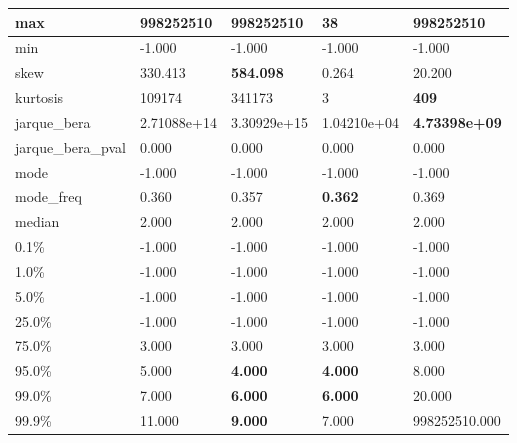 \begin{table}[H]
\begin{tabular}{|l|m{10em}|m{10em}|m{10em}|m{10em}|}
\hline max & 998252510 & \bfseries 998252510 & \cellcolor[rgb]{0.9, 0.54, 0.52} 38 & \bfseries 998252510 \\
\hline min & -1.000 & -1.000 & -1.000 & -1.000 \\
\hline skew & 330.413 & \bfseries 584.098 & \cellcolor[rgb]{0.9, 0.54, 0.52} 0.264 & 20.200 \\
\hline kurtosis & 109174 & \cellcolor[rgb]{0.9, 0.54, 0.52} 341173 & 3 & \bfseries 409 \\
\hline jarque\_bera & 2.71088e+14 & \cellcolor[rgb]{0.9, 0.54, 0.52} 3.30929e+15 & 1.04210e+04 & \bfseries 4.73398e+09 \\
\hline jarque\_bera\_pval & 0.000 & 0.000 & 0.000 & 0.000 \\
\hline mode & -1.000 & -1.000 & -1.000 & -1.000 \\
\hline mode\_freq & 0.360 & 0.357 & \bfseries 0.362 & \cellcolor[rgb]{0.9, 0.54, 0.52} 0.369 \\
\hline median & 2.000 & 2.000 & 2.000 & 2.000 \\
\hline 0.1\% & -1.000 & -1.000 & -1.000 & -1.000 \\
\hline 1.0\% & -1.000 & -1.000 & -1.000 & -1.000 \\
\hline 5.0\% & -1.000 & -1.000 & -1.000 & -1.000 \\
\hline 25.0\% & -1.000 & -1.000 & -1.000 & -1.000 \\
\hline 75.0\% & 3.000 & 3.000 & 3.000 & 3.000 \\
\hline 95.0\% & 5.000 & \bfseries 4.000 & \bfseries 4.000 & \cellcolor[rgb]{0.9, 0.54, 0.52} 8.000 \\
\hline 99.0\% & 7.000 & \bfseries 6.000 & \bfseries 6.000 & \cellcolor[rgb]{0.9, 0.54, 0.52} 20.000 \\
\hline 99.9\% & 11.000 & \bfseries 9.000 & 7.000 & \cellcolor[rgb]{0.9, 0.54, 0.52} 998252510.000 \\
\hline
\end{tabular}
\end{table}

